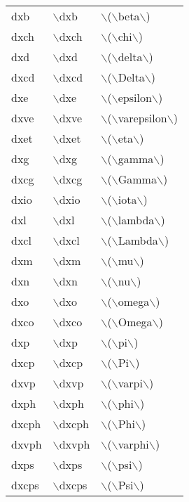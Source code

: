 \begin{longtable}{p{20mm}p{20mm}p{65mm}}
dxb & $\backslash$dxb & $\backslash$($\backslash$beta$\backslash$)\\
dxch & $\backslash$dxch & $\backslash$($\backslash$chi$\backslash$)\\
dxd & $\backslash$dxd & $\backslash$($\backslash$delta$\backslash$)\\
dxcd & $\backslash$dxcd & $\backslash$($\backslash$Delta$\backslash$)\\
dxe & $\backslash$dxe & $\backslash$($\backslash$epsilon$\backslash$)\\
dxve & $\backslash$dxve & $\backslash$($\backslash$varepsilon$\backslash$)\\
dxet & $\backslash$dxet & $\backslash$($\backslash$eta$\backslash$)\\
dxg & $\backslash$dxg & $\backslash$($\backslash$gamma$\backslash$)\\
dxcg & $\backslash$dxcg & $\backslash$($\backslash$Gamma$\backslash$)\\
dxio & $\backslash$dxio & $\backslash$($\backslash$iota$\backslash$)\\
dxl & $\backslash$dxl & $\backslash$($\backslash$lambda$\backslash$)\\
dxcl & $\backslash$dxcl & $\backslash$($\backslash$Lambda$\backslash$)\\
dxm & $\backslash$dxm & $\backslash$($\backslash$mu$\backslash$)\\
dxn & $\backslash$dxn & $\backslash$($\backslash$nu$\backslash$)\\
dxo & $\backslash$dxo & $\backslash$($\backslash$omega$\backslash$)\\
dxco & $\backslash$dxco & $\backslash$($\backslash$Omega$\backslash$)\\
dxp & $\backslash$dxp & $\backslash$($\backslash$pi$\backslash$)\\
dxcp & $\backslash$dxcp & $\backslash$($\backslash$Pi$\backslash$)\\
dxvp & $\backslash$dxvp & $\backslash$($\backslash$varpi$\backslash$)\\
dxph & $\backslash$dxph & $\backslash$($\backslash$phi$\backslash$)\\
dxcph & $\backslash$dxcph & $\backslash$($\backslash$Phi$\backslash$)\\
dxvph & $\backslash$dxvph & $\backslash$($\backslash$varphi$\backslash$)\\
dxps & $\backslash$dxps & $\backslash$($\backslash$psi$\backslash$)\\
dxcps & $\backslash$dxcps & $\backslash$($\backslash$Psi$\backslash$)\\

\end{longtable}
